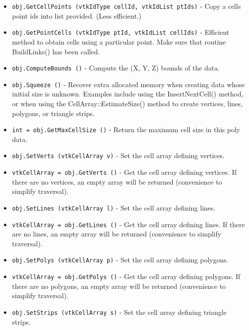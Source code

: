 \begin{itemize}
\item  \verb|obj.GetCellPoints (vtkIdType cellId, vtkIdList ptIds)| -  Copy a cells point ids into list provided. (Less efficient.)

\item  \verb|obj.GetPointCells (vtkIdType ptId, vtkIdList cellIds)| -  Efficient method to obtain cells using a particular point. Make sure that
 routine BuildLinks() has been called.

\item  \verb|obj.ComputeBounds ()| -  Compute the (X, Y, Z)  bounds of the data.

\item  \verb|obj.Squeeze ()| -  Recover extra allocated memory when creating data whose initial size
 is unknown. Examples include using the InsertNextCell() method, or
 when using the CellArray::EstimateSize() method to create vertices,
 lines, polygons, or triangle strips.

\item  \verb|int = obj.GetMaxCellSize ()| -  Return the maximum cell size in this poly data.

\item  \verb|obj.SetVerts (vtkCellArray v)| -  Set the cell array defining vertices.

\item  \verb|vtkCellArray = obj.GetVerts ()| -  Get the cell array defining vertices. If there are no vertices, an
 empty array will be returned (convenience to simplify traversal).

\item  \verb|obj.SetLines (vtkCellArray l)| -  Set the cell array defining lines.

\item  \verb|vtkCellArray = obj.GetLines ()| -  Get the cell array defining lines. If there are no lines, an
 empty array will be returned (convenience to simplify traversal).

\item  \verb|obj.SetPolys (vtkCellArray p)| -  Set the cell array defining polygons.

\item  \verb|vtkCellArray = obj.GetPolys ()| -  Get the cell array defining polygons. If there are no polygons, an
 empty array will be returned (convenience to simplify traversal).

\item  \verb|obj.SetStrips (vtkCellArray s)| -  Set the cell array defining triangle strips.


\end{itemize}
